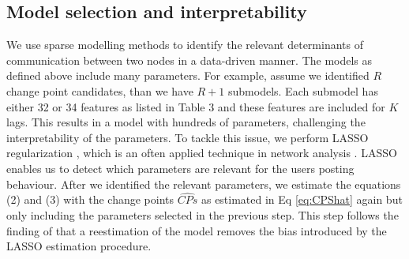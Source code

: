 \subsection*{Model selection and interpretability}
\label{sec:modelsel}
We use sparse modelling methods \citep{Barigozzi2019, Trimborn2022a, Trimborn2022, Zhang2023} to identify the relevant determinants of communication between two nodes in a data-driven manner. 
The models as defined above include many parameters. For example, assume we identified $R$ change point candidates, than we have $R+1$ submodels. Each submodel has either 32 or 34 features as listed in Table 3 and these features are included for $K$ lags. This results in a model with hundreds of parameters, challenging the interpretability of the parameters. To tackle this issue, we perform LASSO regularization \citep{tibshirani_regression_1996}, which is an often applied technique in network analysis \citep{Barigozzi2019, Trimborn2022a, Trimborn2022, Zhang2023}. LASSO enables us to detect which parameters are relevant for the users posting behaviour. After we identified the relevant parameters, we estimate the equations (2) and (3) with the change points $\widehat{CPs}$ as estimated in Eq \eqref{eq:CPShat} again but only including the parameters selected in the previous step. This step follows the finding of \textcite{Belloni2013} that a reestimation of the model removes the bias introduced by the LASSO estimation procedure. %

